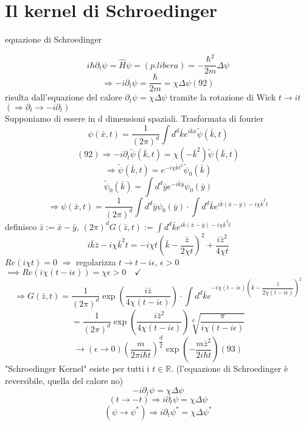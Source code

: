 \documentclass[a4paper,11pt]{report}
\newcommand{\R}{\mathbb{R}}
\newcommand{\x}{\bar{x}}
\newcommand{\y}{\bar{y}}
\newcommand{\kk}{\bar{k}}
\newcommand{\z}{\bar{z}}
\begin{document}

\section{Il kernel di Schroedinger}

equazione di Schroedinger

$$
i\hbar \partial_t \psi = \hat{H}\psi =(p. libera)= -\dfrac{\hbar^2}{2m}\Delta \psi 
$$
\begin{equation}
\Rightarrow -i\partial_t \psi =\dfrac{\hbar}{2m}=\chi \Delta \psi (92)
\end{equation}
risulta dall'equazione del calore $\partial_t \psi =\chi \Delta \psi$ tramite la rotazione di Wick $t \rightarrow it$ $(\Rightarrow \partial _t \rightarrow -i\partial_t)$\\
Supponiamo di essere in d dimensioni spaziali. Trasformata di fourier
$$
\psi(\x,t)=\dfrac{1}{(2\pi)^d}\int d^d\kk e^{i\kk \x}\tilde{\psi}(\kk,t)
$$
$$
(92)\Rightarrow -i\partial_t \tilde{\psi}(\kk,t)=\chi (-\kk ^2)\tilde{\psi}(\kk,t)
$$
$$
\Rightarrow \tilde{\psi}(\kk,t) = e^{-i\chi\kk t^2}\tilde{\psi}_0(\kk)
$$
$$
\tilde{\psi}_0(\kk) = \int d^d \y e^{-i\kk \y} \psi_0(\y)
$$
$$
\Rightarrow \psi(\x,t) = \dfrac{1}{(2\pi)^d}\int d^d \y \psi_0(\y) \cdot \int d^d\kk e^{i\kk(\x-\y) - i\chi \kk^2 t}
$$
definisco $\z :=\x - \y$, \quad $(2\pi)^d G(\z,t) :=\int d^d\kk e^{i\kk(\x-\y) - i\chi \kk^2 t}$
$$
i\kk \z - i \chi \kk^2 t = -i\chi t\left(\kk - \dfrac{\z}{2\chi t}\right)^2 + \dfrac{i\z^2}{4\chi t}
$$
$Re(i\chi t)=0$ $\Rightarrow$ regolarizza $t\rightarrow t-i\epsilon$, $\epsilon>0$ $\implies Re(i\chi(t-i\epsilon))=\chi\epsilon >0 \quad \checkmark$
$$
\Rightarrow G(\z,t)=\dfrac{1}{(2\pi)^d}\exp \left(\dfrac{i\z}{4\chi(t-i\epsilon)}\right)\cdot \int d^d\kk e^{-i\chi(t-i\epsilon)\left( \kk -\dfrac{\z}{2\chi(t-i\epsilon)}\right)^2}
$$
$$
=\dfrac{1}{(2\pi)^d}\exp\left(\dfrac{i\z^2}{4\chi(t-i\epsilon)}\right)\sqrt[d]{\dfrac{\pi}{i\chi(t-i\epsilon)}}
$$
\begin{equation}
\rightarrow (\epsilon \to 0) \left(\dfrac{m}{2\pi i \hbar t}\right)^{\dfrac{d}{2}}\exp \left(-\dfrac{m\z^2}{2i\hbar t}  \right) (93)
\end{equation}
"Schroedinger Kernel" esiste per tutti i $t\in \R$. (l'equazione di Schroedinger è reversibile, quella del calore no)
$$
-i\partial_t \psi =\chi \Delta \psi
$$
$$
(t\to -t)\Rightarrow i\partial_t\psi=\chi\Delta \psi
$$
$$
(\psi \to \psi^*)\Rightarrow i\partial_t\psi^*=\chi\Delta \psi^*
$$
\end{document}
